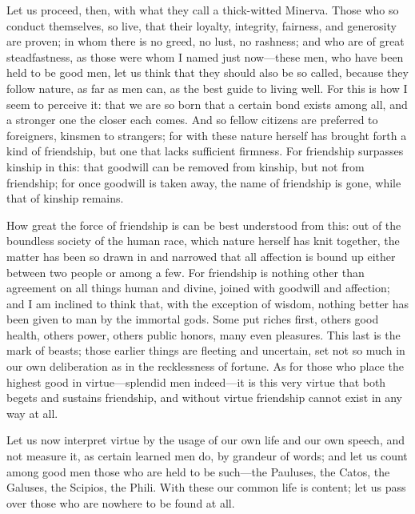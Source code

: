  Let us proceed, then, with what they call a thick-witted Minerva. Those who so conduct themselves, so live, that their loyalty, integrity, fairness, and generosity are proven; in whom there is no greed, no lust, no rashness; and who are of great steadfastness, as those were whom I named just now—these men, who have been held to be good men, let us think that they should also be so called, because they follow nature, as far as men can, as the best guide to living well. For this is how I seem to perceive it: that we are so born that a certain bond exists among all, and a stronger one the closer each comes. And so fellow citizens are preferred to foreigners, kinsmen to strangers; for with these nature herself has brought forth a kind of friendship, but one that lacks sufficient firmness. For friendship surpasses kinship in this: that goodwill can be removed from kinship, but not from friendship; for once goodwill is taken away, the name of friendship is gone, while that of kinship remains.

 How great the force of friendship is can be best understood from this: out of the boundless society of the human race, which nature herself has knit together, the matter has been so drawn in and narrowed that all affection is bound up either between two people or among a few. For friendship is nothing other than agreement on all things human and divine, joined with goodwill and affection; and I am inclined to think that, with the exception of wisdom, nothing better has been given to man by the immortal gods. Some put riches first, others good health, others power, others public honors, many even pleasures. This last is the mark of beasts; those earlier things are fleeting and uncertain, set not so much in our own deliberation as in the recklessness of fortune. As for those who place the highest good in virtue—splendid men indeed—it is this very virtue that both begets and sustains friendship, and without virtue friendship cannot exist in any way at all.

 Let us now interpret virtue by the usage of our own life and our own speech, and not measure it, as certain learned men do, by grandeur of words; and let us count among good men those who are held to be such—the Pauluses, the Catos, the Galuses, the Scipios, the Phili. With these our common life is content; let us pass over those who are nowhere to be found at all.

